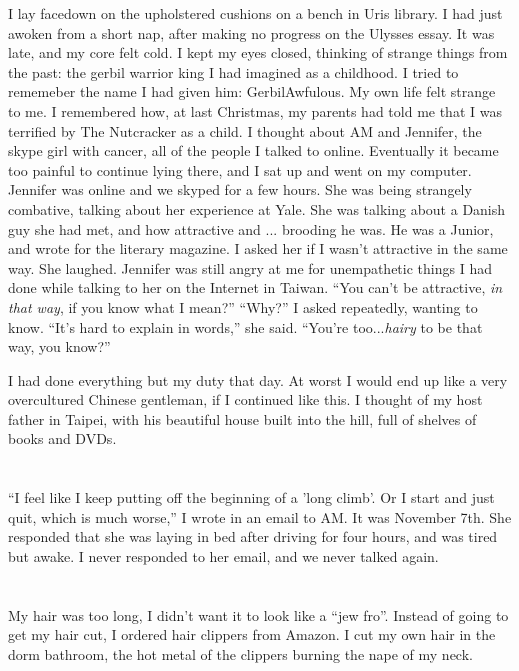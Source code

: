 I lay facedown on the upholstered cushions on a bench in Uris library.  I had
just awoken from a short nap, after making no progress on the Ulysses essay.  It
was late, and my core felt cold.  I kept my eyes closed, thinking of strange
things from the past: the gerbil warrior king I had imagined as a childhood.  I
tried to rememeber the name I had given him: GerbilAwfulous.  My own life felt
strange to me.  I remembered how, at last Christmas, my parents had told me that
I was terrified by The Nutcracker as a child.  I thought about AM and Jennifer,
the skype girl with cancer, all of the people I talked to online.  Eventually it
became too painful to continue lying there, and I sat up and went on my
computer.  Jennifer was online and we skyped for a few hours.  She was being
strangely combative, talking about her experience at Yale.  She was talking
about a Danish guy she had met, and how attractive and ... brooding he was.  He
was a Junior, and wrote for the literary magazine.  I asked her if I wasn't
attractive in the same way.  She laughed.  Jennifer was still angry at me for
unempathetic things I had done while talking to her on the Internet in Taiwan.
``You can't be attractive, \textit{in that way}, if you know what I mean?''
``Why?'' I asked repeatedly, wanting to know. ``It's hard to explain in words,''
she said.  ``You're too...\textit{hairy} to be that way, you know?''

I had done everything but my duty that day.  At worst I would end up like a very
overcultured Chinese gentleman, if I continued like this.  I thought of my host
father in Taipei, with his beautiful house built into the hill, full of shelves
of books and DVDs.  

\section{}

``I feel like I keep putting off the beginning of a 'long climb'.  Or I start
and just quit, which is much worse,'' I wrote in an email to AM.  It was
November 7th. She responded that she was laying in bed after driving for four
hours, and was tired but awake.  I never responded to her email, and we never
talked again.

\section{}

My hair was too long, I didn't want it to look like a ``jew fro''.  Instead of
going to get my hair cut, I ordered hair clippers from Amazon.  I cut my own
hair in the dorm bathroom, the hot metal of the clippers burning the nape of my
neck.  

